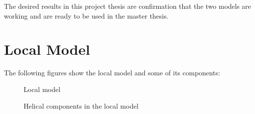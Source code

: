 \label{chap:results}
The desired results in this project thesis are confirmation that the two models are working and are ready to be used in the master thesis. 

\section{Local Model}
The following figures show the local model and some of its components:

\begin{figure}[H]
\hfill
{}\hfill
\caption{Local model}
\label{fig:volt}
\end{figure}

\begin{figure}[H]
\hfill
{}\hfill
\caption{Helical components in the local model}
\label{fig:volt}
\end{figure}



